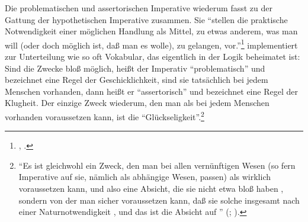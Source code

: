 Die problematischen und assertorischen Imperative wiederum fasst
 zu der Gattung der hypothetischen Imperative zusammen. Sie
\enquote{stellen die praktische Notwendigkeit einer möglichen Handlung als
Mittel, zu etwas anderem, was man will (oder doch möglich ist, daß man es
wolle), zu gelangen, vor.}\footnote{\cite[][BA
39]{Kant:GrundlegungzurMetaphysikderSitten1965}, \cite[][IV:
414.13--15]{Kant:GesammelteWerke1900ff.}.} 
implementiert zur Unterteilung wie so oft Vokabular, das eigentlich in der Logik
beheimatet ist: Sind die Zwecke bloß möglich, heißt der Imperativ
\enquote{problematisch} und bezeichnet eine Regel der
Geschicklichkeit, sind sie tatsächlich bei jedem Menschen vorhanden, dann heißt
er \enquote{assertorisch} und bezeichnet eine Regel der Klugheit. Der einzige
Zweck wiederum, den man als bei jedem Menschen vorhanden voraussetzen kann, ist
die \enquote{Glückseligkeit}.\footnote{\enquote{Es ist gleichwohl ein Zweck, den
man bei allen vernünftigen Wesen (so fern Imperative auf sie, nämlich als
abhängige Wesen, passen) als wirklich voraussetzen kann, und also eine Absicht,
die sie nicht etwa bloß haben , sondern von der man sicher
voraussetzen kann, daß sie solche insgesamt nach einer Naturnotwendigkeit
, und das ist die Absicht auf }
\mkbibparens{\cite[][BA 42]{Kant:GrundlegungzurMetaphysikderSitten1965};
\cite[][IV: 415.28--33]{Kant:GesammelteWerke1900ff.}}.}


